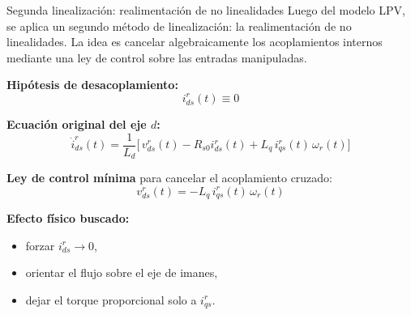 \documentclass[aspectratio=169,t]{beamer}
\begin{document}
\begin{frame}{Segunda linealización: realimentación de no linealidades}
{\small\color{uncGray}Luego del modelo LPV, se aplica un segundo método de linealización: la realimentación de no linealidades. La idea es cancelar algebraicamente los acoplamientos internos mediante una ley de control sobre las entradas manipuladas.}\par
\vspace{3mm}

\textbf{Hipótesis de desacoplamiento:}
\begin{equation*}
i_{ds}^{r}(t)\equiv 0
\end{equation*}

\textbf{Ecuación original del eje $d$:}
\begin{equation*}
\dot{i}_{ds}^{r}(t)=\frac{1}{L_d}\Big[\,v_{ds}^{r}(t)-R_{s0}i_{ds}^{r}(t)+L_q\,i_{qs}^{r}(t)\,\omega_r(t)\Big]
\end{equation*}

\textbf{Ley de control mínima} para cancelar el acoplamiento cruzado:
\begin{equation*}
\boxed{\;v_{ds}^{r}(t)=-L_q\,i_{qs}^{r}(t)\,\omega_r(t)\;}
\end{equation*}

\textbf{Efecto físico buscado:}
\begin{itemize}
  \item forzar $i_{ds}^{r}\to 0$,
  \item orientar el flujo sobre el eje de imanes,
  \item dejar el torque proporcional solo a $i_{qs}^{r}$.
\end{itemize}
\end{frame}
\end{document}
